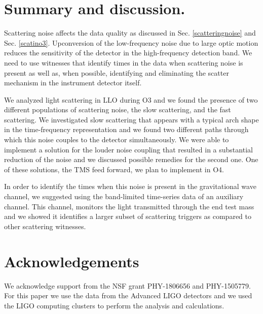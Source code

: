 \documentclass[12pt]{iopart}
\begin{document}
\newpage
\section{Summary and discussion.}\label{summary}
 Scattering noise affects the data quality as discussed in Sec. \ref{scatteringnoise} and Sec. \ref{scatino3}. Upconversion of the low-frequency noise due to large optic motion reduces the sensitivity of the detector in the high-frequency detection band. We need to use witnesses that identify times in the data when scattering noise is present as well as, when possible, identifying and eliminating the scatter mechanism in the instrument detector itself. 

We analyzed light scattering in LLO during O3 and we found the presence of two different populations of scattering noise, the slow scattering, and the fast scattering. We investigated slow scattering that appears with a typical arch shape in the time-frequency representation and we found two different paths through which this noise couples to the detector simultaneously. We were able to implement a solution for the louder noise coupling that resulted in a substantial reduction of the noise and we discussed possible remedies for the second one. One of these solutions, the TMS feed forward, we plan to implement in O4.

In order to identify the times when this noise is present in the gravitational wave channel, we suggested using the band-limited time-series data of an auxiliary channel. This channel, monitors the light transmitted through the end test mass and we showed it identifies a larger subset of scattering triggers as compared to other scattering witnesses.
\par

\section{Acknowledgements} We acknowledge support from the NSF grant PHY-1806656 and PHY-1505779. For this paper we use the data from the Advanced LIGO detectors and we used the LIGO computing clusters to perform the analysis and calculations. 

  

\end{document}
